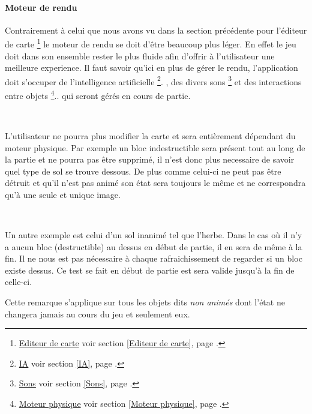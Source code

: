 {		\paragraph{Moteur de rendu\\}
		
			\hypertarget{Moteur de rendu}{}
			\label{Moteur de rendu}
		
			Contrairement à celui que nous avons vu dans la section précédente pour
			l'éditeur de carte
			\footnote{
				\hyperlink{Editeur de carte}{Editeur de carte}
				\og voir section \ref{Editeur de carte}, page \pageref{Editeur de carte}.\fg
			}
			le moteur de rendu se doit d'être beaucoup plus léger. En effet le jeu doit
			dans son ensemble rester le plus fluide afin d'offrir à l'utilisateur une meilleure
			experience. Il faut savoir qu'ici en plus de gérer le rendu, l'application
			doit s'occuper de l'intelligence artificielle
			\footnote{
				\hyperlink{IA}{IA}
				\og voir section \ref{IA}, page \pageref{IA}.\fg
			}.
			, des divers sons
			\footnote{
				\hyperlink{Sons}{Sons}
				\og voir section \ref{Sons}, page \pageref{Sons}.\fg
			} et des interactions entre objets
			 \footnote{
				\hyperlink{Moteur physique}{Moteur physique}
				\og voir section \ref{Moteur physique}, page \pageref{Moteur physique}.\fg
			}..
			qui seront gérés en cours de partie.		
			
			$\,$	
			
			L'utilisateur ne pourra plus modifier la carte et sera
			entièrement dépendant du moteur physique\footnotemark[3]. Par
			exemple un bloc indestructible sera présent tout au long de la
			partie et ne pourra pas être supprimé, il n'est donc plus necessaire de
			savoir quel type de sol se trouve dessous. De plus comme celui-ci ne peut pas
			être détruit et qu'il n'est pas animé son état sera toujours le même et ne
			correspondra qu'à une seule et unique image.
			
			$\,$			
			
			Un autre exemple est celui d'un sol inanimé tel que l'herbe. Dans le cas où
			il n'y a aucun bloc (destructible) au dessus en début de partie, il en sera
			de même à la fin. Il ne nous est pas nécessaire à chaque
			rafraichissement de regarder si un bloc existe dessus. Ce test se fait en
			début de partie est sera valide jusqu'à la fin de celle-ci.
			
			
			Cette remarque s'applique sur tous les objets dits \emph{non animés} dont
			l'état ne changera jamais au cours du jeu et seulement eux.
			
}

